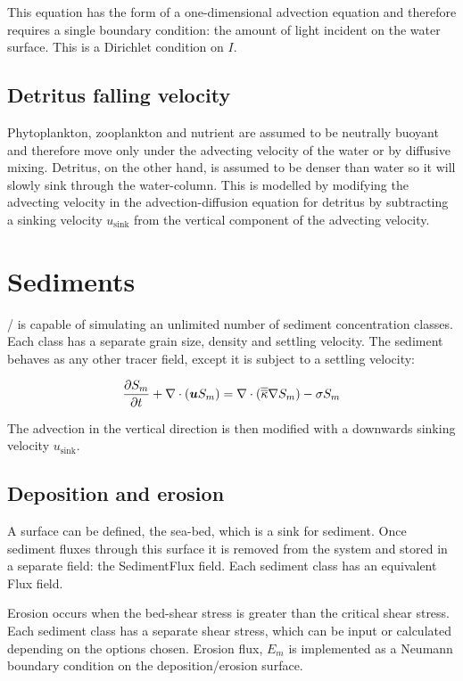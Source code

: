 This equation has the form of a one-dimensional advection equation and
therefore requires a single boundary condition: the amount of light incident
on the water surface. This is a Dirichlet condition on $I$.

\subsection{Detritus falling velocity}\label{sec:detritus}

Phytoplankton, zooplankton and nutrient are assumed to be neutrally buoyant
and therefore move only under the advecting velocity of the water or by
diffusive mixing. Detritus, on the other hand, is assumed to be denser than
water so it will slowly sink through the water-column. This is modelled by
modifying the advecting velocity in the advection-diffusion equation for
detritus by subtracting a sinking velocity $u_{\mathrm{sink}}$ from the
vertical component of the advecting velocity.



\section{Sediments}

\fluidity/ is capable of simulating an unlimited number of sediment concentration classes.
Each class has a separate grain size, density and settling velocity. The sediment behaves
as any other tracer field, except it is subject to a settling velocity:

\begin{equation}\label{eq:sediment_conc}
\frac{\partial S_m}{\partial t} + \nabla\cdot({\mbox{\boldmath$u$}} S_m) = \nabla\cdot(\overline{\overline{\kappa}}\nabla S_m) - \sigma S_m
\end{equation}

The advection in the vertical direction is then modified with a downwards sinking 
velocity $u_{\mathrm{sink}}$. 

\subsection{Deposition and erosion}

A surface can be defined, the sea-bed, which is a sink for sediment. Once sediment
fluxes through this surface it is removed from the system and stored in a separate 
field: the SedimentFlux field. Each sediment class has an equivalent Flux field.

Erosion occurs when the bed-shear stress is greater than the critical shear stress. Each
sediment class has a separate shear stress, which can be input or calculated depending
on the options chosen. Erosion flux, $E_m$ is implemented as a Neumann boundary condition
on the deposition/erosion surface.

